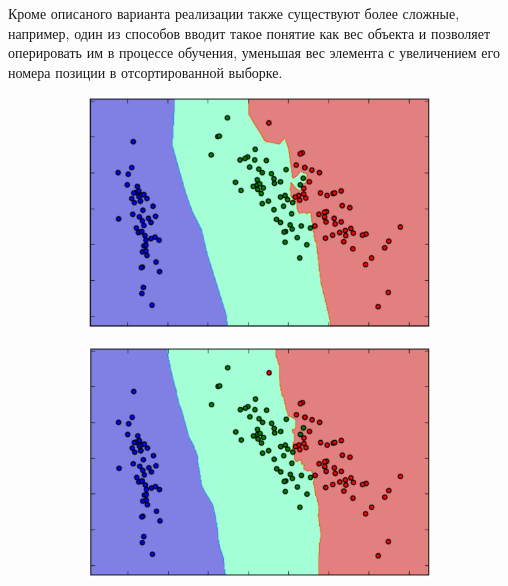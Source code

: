 Кроме описаного варианта реализации также существуют более сложные, например, один из способов вводит такое понятие как вес объекта и позволяет оперировать им в процессе обучения, уменьшая вес элемента с увеличением его номера позиции в отсортированной выборке.

\begin{figure}[ht]
	\centering
    \begin{subfigure}[b]{0.3\textwidth}
    \centering
        \includegraphics[scale=0.22]{pasted-image-21.png}
        \caption{}
    \end{subfigure}
 	\begin{subfigure}[b]{0.3\textwidth}
    \centering
        \includegraphics[scale=0.22]{pasted-image-23.png}
        \caption{}
    \end{subfigure}
    \begin{subfigure}[b]{0.3\textwidth}

\end{subfigure}
\end{figure}
